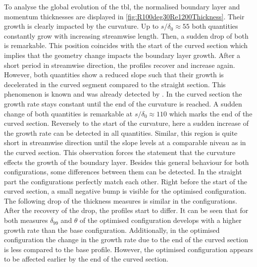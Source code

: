 To analyse the global evolution of the \acrshort{tbl}, the normalised boundary layer and momentum thicknesses are displayed in \autoref{fig:R100deg30Re1200Thickness}.
Their growth is clearly impacted by the curvature.
Up to $s/\delta_0 \approx 55$ both quantities constantly grow with increasing streamwise length.
Then, a sudden drop of both is remarkable. 
This position coincides with the start of the curved section which implies that the geometry change impacts the boundary layer growth.
After a short period in streamwise direction, the profiles recover and increase again. 
However, both quantities show a reduced slope such that their growth is decelerated in the curved segment compared to the straight section.
This phenomenon is known and was already detected by \citet{gillis_turbulent_1983}.
In the curved section the growth rate stays constant until the end of the curvature is reached.
A sudden change of both quantities is remarkable at $s/\delta_0 \approx 110$ which marks the end of the curved section.
Reversely to the start of the curvature, here a sudden increase of the growth rate can be detected in all quantities.
Similar, this region is quite short in streamwise direction until the slope levels at a comparable niveau as in the curved section.
This observation forces the statement that the curvature effects the growth of the boundary layer.
Besides this general behaviour for both configurations, some  differences between them can be detected.
In the straight part the configurations perfectly match each other. 
Right before the start of the curved section, a small negative bump is visible for the optimised configuration.
The following drop of the thickness measures is similar in the configurations.
After the recovery of the drop, the profiles start to differ.
It can be seen that for both measures $\delta_{99}$ and $\theta$ of the optimised configuration develops with a higher growth rate than the base configuration.
Additionally, in the optimised configuration the change in the growth rate due to the end of the curved section is less compared to the base profile.
However, the optimised configuration appears to be affected earlier by the end of the curved section.

